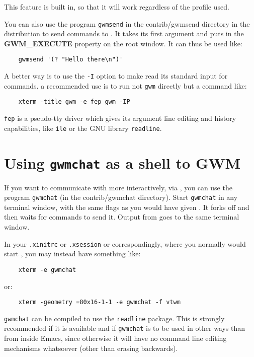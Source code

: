 This feature is built in, so that it will work regardless of the
profile used.

You can also use the program {\tt gwmsend} in the contrib/gwmsend
directory in the distribution to send commands to {\GWM}.
It takes its first argument and puts in the {\bf GWM\_EXECUTE} property on
the root window. It can thus be used like:
\begin{verbatim}
    gwmsend '(? "Hello there\n")'
\end{verbatim}

A better way is to use the \verb|-I| option to make {\GWM} read its standard
input for commands. a recommended use is to run not \verb|gwm| directly but a
command like:
\begin{verbatim}
    xterm -title gwm -e fep gwm -IP
\end{verbatim}
\verb|fep| is a pseudo-tty driver which gives its argument line editing and
history capabilities, like \verb|ile| or the GNU library \verb|readline|.

\section{Using {\tt gwmchat} as a shell to GWM}

If you want to communicate with {\GWM} more interactively, via {\WOOL}, you
can use the program {\tt gwmchat} (in the contrib/gwmchat
directory). Start {\tt gwmchat} in any 
terminal window, with the same flags as you would have given {\GWM}. It
forks off {\GWM} and then waits for commands to send it. Output from {\GWM}
goes to the same terminal window. 

In your {\tt .xinitrc} or {\tt .xsession} or correspondingly, where
you normally would start {\GWM}, you may instead have something like:
\begin{verbatim}
    xterm -e gwmchat
\end{verbatim}
or:
\begin{verbatim}
    xterm -geometry =80x16-1-1 -e gwmchat -f vtwm
\end{verbatim}

{\tt gwmchat} can be compiled to use the {\tt readline} package. This
is strongly recommended if it is available and if {\tt gwmchat} is to
be used in other ways than from inside Emacs, since otherwise it will
have no command line editing mechanisms whatsoever (other than erasing
backwards). 

%

